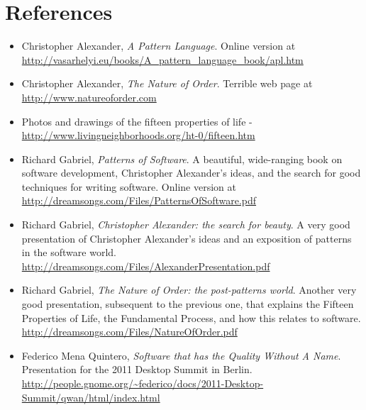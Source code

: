 \section*{References}
\begin{itemize}
 \item Christopher Alexander, \textit{A Pattern Language}. Online version at
\url{http://vasarhelyi.eu/books/A\_pattern\_language\_book/apl.htm}
 \item Christopher Alexander, \textit{The Nature of Order}. Terrible web page at
\url{http://www.natureoforder.com}
 \item Photos and drawings of the fifteen properties of life -
\url{http://www.livingneighborhoods.org/ht-0/fifteen.htm}
 \item Richard Gabriel, \textit{Patterns of Software}. A beautiful, wide-ranging
book on software development, Christopher Alexander's ideas, and the search for
good techniques for writing software. Online version at
\url{http://dreamsongs.com/Files/PatternsOfSoftware.pdf}
 \item Richard Gabriel, \textit{Christopher Alexander: the search for beauty}. A
very good presentation of Christopher Alexander's ideas and an exposition of
patterns in the software world.
\url{http://dreamsongs.com/Files/AlexanderPresentation.pdf}
 \item Richard Gabriel, \textit{The Nature of Order: the post-patterns world}.
Another very good presentation, subsequent to the previous one, that explains
the Fifteen Properties of Life, the Fundamental Process, and how this relates to
software. \url{http://dreamsongs.com/Files/NatureOfOrder.pdf}
 \item Federico Mena Quintero, \textit{Software that has the Quality
   Without A Name}.  Presentation for the 2011 Desktop Summit in
   Berlin.  \url{http://people.gnome.org/~federico/docs/2011-Desktop-Summit/qwan/html/index.html}
\end{itemize}
